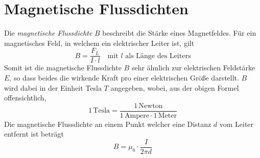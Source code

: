 \documentclass{article}
\newcommand{\ounit}[1]{
 1\,\text{#1} 
}
\begin{document}
\section{Magnetische Flussdichten}
Die \emph{magnetische Flussdichte} $B$ beschreibt die Stärke eines Magnetfeldes. Für ein magnetisches Feld, in welchem ein elektrischer Leiter ist, gilt
\[
 B = \frac{F_L}{I \cdot l} 
 \quad \text{mit $l$ als Länge des Leiters} 
\]
Somit ist die magnetische Flussdichte $B$ sehr ähnlich zur elektrischen Feldstärke $E$, so dass beides die wirkende Kraft pro einer elektrischen Größe darstellt. \newline
$B$ wird dabei in der Einheit Tesla $T$ angegeben, wobei, aus der obigen Formel offensichtlich,
\[ 
 \ounit{Tesla} = \frac{\ounit{Newton}}{\ounit{Ampere} \cdot \ounit{Meter}}
\] 
Die magnetische Flussdichte an einem Punkt welcher eine Distanz $d$ vom Leiter entfernt ist beträgt
\[
 B = \mu_0 \cdot \frac{I}{2 \pi d} 
\] 
\end{document}
